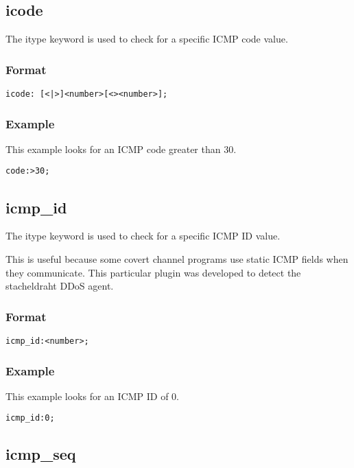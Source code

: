 \documentclass[english]{report}
\begin{document}
\subsection{icode}

The itype keyword is used to check for a specific ICMP code value.

\subsubsection{Format}
\begin{verbatim}
icode: [<|>]<number>[<><number>];
\end{verbatim}

\subsubsection{Example}
This example looks for an ICMP code greater than 30.
\begin{verbatim}
code:>30;
\end{verbatim}

\subsection{icmp\_id}

The itype keyword is used to check for a specific ICMP ID value.

This is useful because some covert channel programs use static ICMP fields when
they communicate.  This particular plugin was developed to detect the
stacheldraht DDoS agent.

\subsubsection{Format}

\begin{verbatim}
icmp_id:<number>;
\end{verbatim}

\subsubsection{Example}

This example looks for an ICMP ID of 0.
\begin{verbatim}
icmp_id:0;
\end{verbatim}

\subsection{icmp\_seq}
\end{document}
